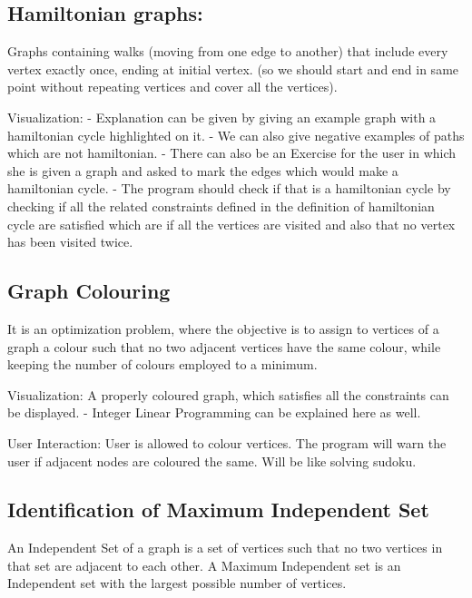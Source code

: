 \hypertarget{hamiltonian-graphs}{%
\subsection{Hamiltonian graphs:}\label{hamiltonian-graphs}}

Graphs containing walks (moving from one edge to another) that include
every vertex exactly once, ending at initial vertex. (so we should start
and end in same point without repeating vertices and cover all the
vertices).

Visualization: - Explanation can be given by giving an example graph
with a hamiltonian cycle highlighted on it. - We can also give negative
examples of paths which are not hamiltonian. - There can also be an
Exercise for the user in which she is given a graph and asked to
mark the edges which would make a hamiltonian cycle. - The program
should check if that is a hamiltonian cycle by checking if all the
related constraints defined in the definition of hamiltonian cycle are
satisfied which are if all the vertices are visited and also that no
vertex has been visited twice.

\hypertarget{graph-clouring}{%
\subsection{Graph Colouring}\label{graph-clouring}}

It is an optimization problem, where the objective is to assign to
vertices of a graph a colour such that no two adjacent vertices have the
same colour, while keeping the number of colours employed to a minimum.


Visualization: A properly coloured graph, which satisfies all the
constraints can be displayed. - Integer Linear Programming can be
explained here as well.


User Interaction: User is allowed to colour vertices. The program
will warn the user if adjacent nodes are coloured the same. Will be
like solving sudoku.

\hypertarget{identification-of-maximum-independent-set}{%
\subsection{Identification of Maximum Independent
Set}\label{identification-of-maximum-independent-set}}

An Independent Set of a graph is a set of vertices such that no two
vertices in that set are adjacent to each other. A Maximum Independent
set is an Independent set with the largest possible number of vertices.

